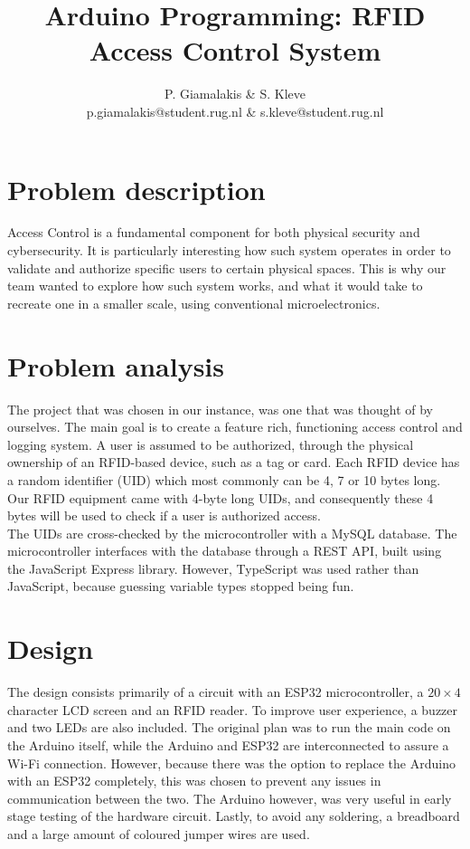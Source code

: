 \documentclass[a4paper,10pt]{article}
\title{Arduino Programming: RFID Access Control System}
\author{P. Giamalakis \& S. Kleve\\
        p.giamalakis@student.rug.nl \& s.kleve@student.rug.nl}
\begin{document}
\maketitle

\section{Problem description}

 Access Control is a fundamental component for both physical security and cybersecurity. It is particularly interesting how such system operates in order to validate and authorize specific users to certain physical spaces. This is why our team wanted to explore how such system works, and what it would take to recreate one in a smaller scale, using conventional microelectronics.

\section{Problem analysis}
The project that was chosen in our instance, was one that was thought of by ourselves. The main goal is to create a feature rich, functioning access control  and logging system. A user is assumed to be authorized, through the physical ownership of an RFID-based device, such as a tag or card. Each RFID device has a random identifier (UID) which most commonly can be 4, 7 or 10 bytes long. Our RFID equipment came with 4-byte long UIDs, and consequently these 4 bytes will be used to check if a user is authorized access. \\
The UIDs are cross-checked by the microcontroller with a MySQL database. The microcontroller interfaces with the database through a REST API, built using the JavaScript Express library. However, TypeScript was used rather than JavaScript, because guessing variable types stopped being fun.
\section{Design}
The design consists primarily of a circuit with an ESP32 microcontroller, a $20 \times 4$ character LCD screen and an RFID reader. To improve user experience, a buzzer and two LEDs are also included. The original plan was to run the main code on the Arduino itself, while the Arduino and ESP32 are interconnected to assure a Wi-Fi connection. However, because there was the option to replace the Arduino with an ESP32 completely, this was chosen to prevent any issues in communication between the two. The Arduino however, was very useful in early stage testing of the hardware circuit. Lastly, to avoid any soldering, a breadboard and a large amount of coloured jumper wires are used.
\end{document}
